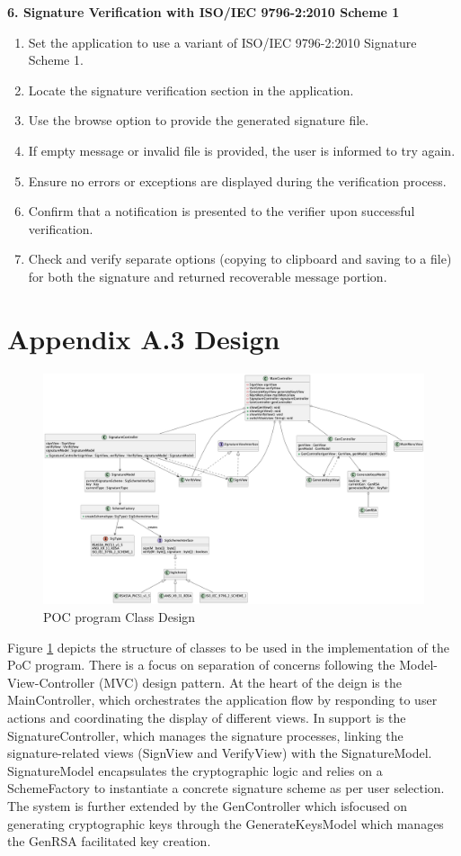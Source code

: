 \documentclass[]{final_report}
\theoremstyle{definition}
\begin{document}
\textbf{6. Signature Verification with ISO/IEC 9796-2:2010 Scheme 1}
\begin{enumerate}
\item Set the application to use a variant of ISO/IEC 9796-2:2010 Signature Scheme 1.
\item Locate the signature verification section in the application.
\item Use the browse option to provide the generated signature file.
\item If empty message or invalid file is provided, the user is informed to try again. 
\item Ensure no errors or exceptions are displayed during the verification process.
\item Confirm that a notification is presented to the verifier upon successful verification.
\item Check and verify separate options (copying to clipboard and saving to a file) for both the signature and returned  recoverable message portion.
\end{enumerate}

\section{Appendix A.3 Design}
\begin{landscape}
\thispagestyle{lscape} %
\begin{figure}[H]
    \centering
    \includegraphics[width=21.7cm]{POC.png}
    \caption{POC program Class Design}
    \label{fig:POCCLASSES}
\end{figure}
\end{landscape}
Figure \ref{fig:POCCLASSES} depicts the structure of classes to be used in the implementation of the PoC program.  There is a focus on separation of concerns following the Model-View-Controller (MVC) design pattern. At the heart of the deign is the MainController, which orchestrates the application flow by responding to user actions and coordinating the display of different views. In support is the SignatureController, which manages the signature processes, linking the signature-related views (SignView and VerifyView) with the SignatureModel. SignatureModel encapsulates the cryptographic logic and relies on a SchemeFactory to instantiate a concrete signature scheme as per user selection. The system is further extended by the GenController which isfocused on generating cryptographic keys through the GenerateKeysModel which manages the GenRSA facilitated key creation.
\end{document}
